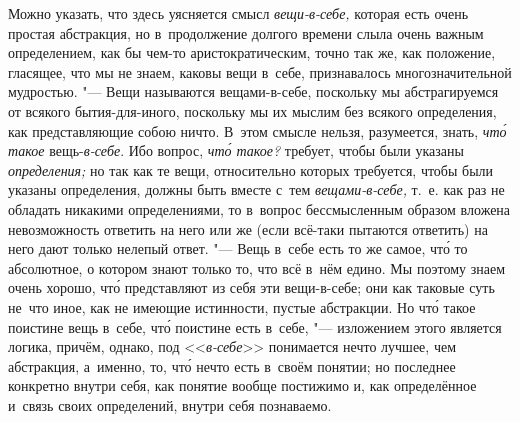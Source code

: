 Можно указать, что здесь уясняется смысл
{\em вещи-в-себе,} которая есть очень простая
абстракция, но в~продолжение долгого времени слыла очень важным
определением, как бы чем-то аристократическим, точно так же, как положение,
гласящее, что мы не знаем, каковы вещи в~себе, признавалось
многозначительной мудростью. "--- Вещи называются вещами-в-себе, поскольку мы
абстрагируемся от всякого бытия-для-иного, поскольку мы их мыслим без
всякого определения, как представляющие собою ничто. В~этом смысле нельзя,
разумеется, знать, {\em чт\'{о} такое}
вещь-{\em в-себе}. Ибо вопрос,
{\em чт\'{о} такое?} требует, чтобы были указаны
{\em определения;} но так как те вещи, относительно
которых требуется, чтобы были указаны определения, должны быть вместе с~тем
{\em вещами-в-себе,} т.~е. как раз не обладать никакими
определениями, то в~вопрос бессмысленным образом вложена невозможность
ответить на него или же (если всё-таки пытаются ответить) на него дают только
нелепый ответ. "--- Вещь в~себе есть то же самое, чт\'{о} то абсолютное,
о котором знают только то, что всё в~нём едино. Мы поэтому знаем очень
хорошо, чт\'{о} представляют из себя эти вещи-в-себе; они как таковые суть
не~что иное, как не имеющие истинности, пустые абстракции. Но чт\'{о} такое
поистине вещь в~себе, чт\'{о} поистине есть в~себе, "--- изложением этого
является логика, причём, однако, под <<{\em в-себе}>> понимается нечто
лучшее, чем абстракция, а~именно, то, чт\'{о} нечто есть в~своём понятии;
но последнее конкретно внутри себя, как понятие вообще постижимо и, как
определённое и~связь своих определений, внутри себя познаваемо.

